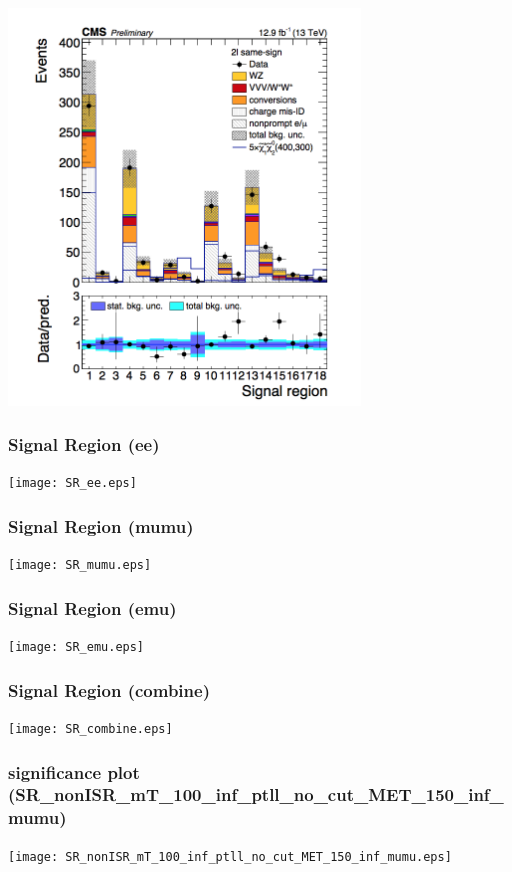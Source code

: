 \documentclass[mathserif,serif]{beamer}
\begin{document}
\begin{frame}
\includegraphics[width=0.7\textwidth]{data/photo/BG.png}
\end{frame}

\begin{frame}
\frametitle{Signal Region (ee)}
\texttt{[image: SR\_ee.eps]}
\end{frame}

\begin{frame}
\frametitle{Signal Region (mumu)}
\texttt{[image: SR\_mumu.eps]}
\end{frame}

\begin{frame}
\frametitle{Signal Region (emu)}
\texttt{[image: SR\_emu.eps]}
\end{frame}

\begin{frame}
\frametitle{Signal Region (combine)}
\texttt{[image: SR\_combine.eps]}
\end{frame}

\begin{frame}
\frametitle{significance plot (SR\_nonISR\_mT\_100\_inf\_ptll\_no\_cut\_MET\_150\_inf\_mumu)}
\texttt{[image: SR\_nonISR\_mT\_100\_inf\_ptll\_no\_cut\_MET\_150\_inf\_mumu.eps]}
\end{frame}
\end{document}
